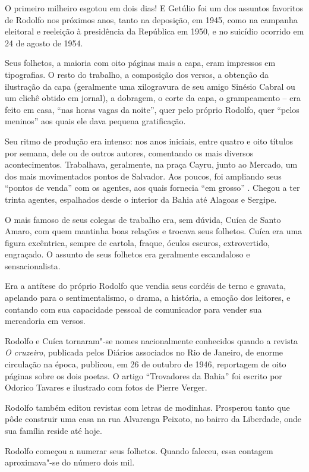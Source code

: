 O primeiro milheiro esgotou em dois dias! E Getúlio foi um dos assuntos
favoritos de Rodolfo nos próximos anos, tanto na deposição, em 1945,
como na campanha eleitoral e reeleição à presidência da República em
1950, e no suicídio ocorrido em 24 de agosto de 1954.

Seus folhetos, a maioria com oito páginas mais a capa, eram impressos
em tipografias. O resto do trabalho, a composição dos versos, a
obtenção da ilustração da capa (geralmente uma xilogravura de seu amigo
Sinésio Cabral ou um clichê obtido em jornal), a dobragem, o corte da
capa, o grampeamento -- era feito em casa, ``nas horas
vagas da noite'', quer pelo próprio Rodolfo, quer
``pelos meninos'' aos quais ele dava pequena
gratificação.

Seu ritmo de produção era intenso: nos anos iniciais, entre quatro e
oito títulos por semana, dele ou de outros autores, comentando os mais
diversos acontecimentos. Trabalhava, geralmente, na praça Cayru, junto
ao Mercado, um dos mais movimentados pontos de Salvador. Aos poucos,
foi ampliando seus ``pontos de venda'' com os
agentes, aos quais fornecia ``em grosso'' .
Chegou a ter trinta agentes, espalhados desde o interior da Bahia até
Alagoas e Sergipe.

O mais famoso de seus colegas de trabalho era, sem dúvida, Cuíca de
Santo Amaro, com quem mantinha boas relações e trocava seus folhetos.
Cuíca era uma figura excêntrica, sempre de cartola, fraque, óculos
escuros, extrovertido, engraçado. O assunto de seus folhetos era
geralmente escandaloso e sensacionalista.

Era a antítese do próprio Rodolfo que vendia seus cordéis de terno e
gravata, apelando para o sentimentalismo, o drama, a história, a emoção
dos leitores, e contando com sua capacidade pessoal de comunicador para
vender sua mercadoria em versos.

Rodolfo e Cuíca tornaram"-se nomes nacionalmente conhecidos quando a
revista \textit{O cruzeiro}, publicada pelos Diários associados no Rio
de Janeiro, de enorme circulação na época, publicou, em 26 de outubro
de 1946, reportagem de oito páginas sobre os dois poetas. O artigo
``Trovadores da Bahia'' foi escrito por
Odorico Tavares e ilustrado com fotos de Pierre Verger.

Rodolfo também editou revistas com letras de modinhas. Prosperou tanto
que pôde construir uma casa na rua Alvarenga Peixoto, no bairro da
Liberdade, onde sua família reside até hoje.

Rodolfo começou a numerar seus folhetos. Quando faleceu, essa contagem
aproximava"-se do número dois mil.

